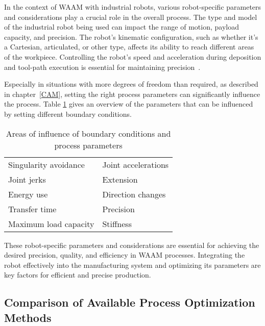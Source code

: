 \documentclass[ZLstudentexpose%
              ,optBiber%
              ,optEnglish%
              ,10pt
              ]{ZLlatex}%
\begin{document}
In the context of WAAM with industrial robots, various robot-specific parameters and considerations play a crucial role in the overall process. The type and model of the industrial robot being used can impact the range of motion, payload capacity, and precision. The robot's kinematic configuration, such as whether it's a Cartesian, articulated, or other type, affects its ability to reach different areas of the workpiece. Controlling the robot's speed and acceleration during deposition and tool-path execution is essential for maintaining precision~\cite{Hsiao.2020}.

Especially in situations with more degrees of freedom than required, as described in chapter~\ref{CAM}, setting the right process parameters can significantly influence the process.
Table \ref{parameter} gives an overview of the parameters that can be influenced by setting different boundary conditions.

\begin{table} [h!]
\centering
\begin{tabular}{|l|l|}
\hline
\hline
Singularity avoidance \cite{Huo.2008b} & Joint accelerations \cite{Gasparetto.2010}\\
Joint jerks \cite{Gasparetto.2010} & Extension \\
Energy use \cite{Paryanto.2015} & Direction changes \cite{Halbauer.2013}\\
Transfer time \cite{Hirzinger.2005} & Precision \cite{Pham.2018}\\
Maximum load capacity \cite{Breaz.2017} & Stiffness \cite{Cvitanic.2020}\\
\hline
\hline

\end{tabular}


\caption{Areas of influence of boundary conditions and process parameters}
\label{parameter}
\end{table}
\newpage
These robot-specific parameters and considerations are essential for achieving the desired precision, quality, and efficiency in WAAM processes. Integrating the robot effectively into the manufacturing system and optimizing its parameters are key factors for efficient and precise production.

\subsection{Comparison of Available Process Optimization Methods}
\end{document}
